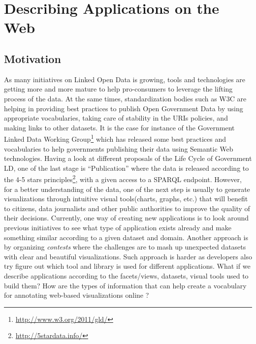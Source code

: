 
\section{Describing Applications on the Web}
 \label{sec:descApps}
 
 \subsection{Motivation}
As many initiatives on Linked Open Data is growing, tools and technologies are getting more and more mature to help pro-consumers to leverage the lifting process of the data. At the same times, standardization bodies such as W3C are helping in providing best practices to publish Open Government Data by using appropriate vocabularies, taking care of stability in the URIs policies, and making links to other datasets. It is the case for instance of the Government Linked Data Working Group\footnote{\url{http://www.w3.org/2011/gld/}} which has released some best practices and vocabularies to help governments publishing their data using Semantic Web technologies. Having a look at different proposals of the Life Cycle of Government LD, one of the last stage is ``Publication'' where the data is released according to the 4-5 stars principles\footnote{\url{http://5stardata.info/}}, with a given access to a SPARQL endpoint. However, for a better understanding of the data, one of the next step is usually to generate visualizations through intuitive visual tools(charts, graphs, etc.) that will benefit to citizens, data journalists and other public authorities to improve the quality of their decisions. Currently, one way of creating new applications is to look around previous initiatives to see what type of application exists already and make something similar according to a given dataset and domain. Another approach is by organizing \textit{contests} where the challenges are to mash up unexpected datasets with clear and beautiful visualizations. Such approach is harder as developers also try figure out which tool and library is used for different applications. What if we describe applications according to the facets/views, datasets, visual tools used to build them? How are the types of information that can help create a vocabulary for annotating web-based visualizations online ? 

